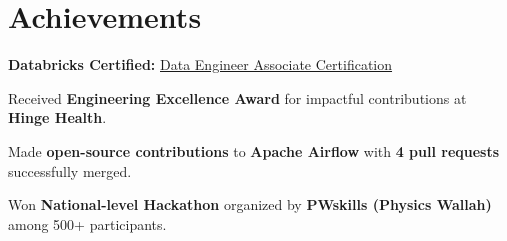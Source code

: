 \documentclass[letterpaper,11pt]{article}
\begin{document}
\section{Achievements}
\begin{itemize}[leftmargin=0.15in, itemsep=-2pt, parsep=0pt]
    \small{
    \item \textbf{Databricks Certified:} \href{https://credentials.databricks.com/ac267e1f-d7f1-4bb5-b3c5-099ac3d74de4#acc.I4vKEm2D}{Data Engineer Associate Certification}
    \item Received \textbf{Engineering Excellence Award} for impactful contributions at \textbf{Hinge Health}.
    \item Made \textbf{open-source contributions} to \textbf{Apache Airflow} with \textbf{4 pull requests} successfully merged.
    \item Won \textbf{National-level Hackathon} organized by \textbf{PWskills (Physics Wallah)} among 500+ participants.
    }
\end{itemize}


\end{document}
